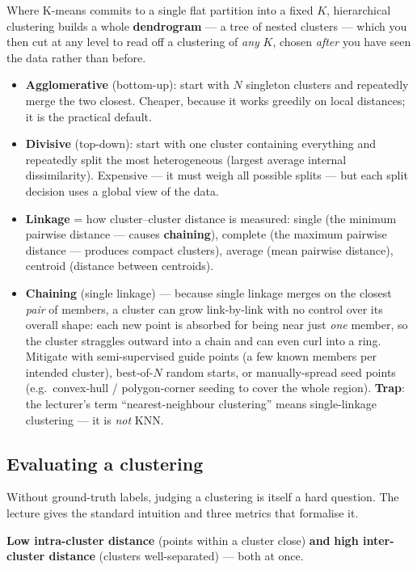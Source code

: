 \documentclass[11pt, a4paper]{article}
\newcommand{\kw}[1]{\textbf{#1}}
\begin{document}
Where K-means commits to a single flat partition into a fixed $K$, hierarchical clustering builds a
whole \kw{dendrogram} — a tree of nested clusters — which you then cut at any level to read off a
clustering of \emph{any} $K$, chosen \emph{after} you have seen the data rather than before.
\begin{itemize}
  \item \kw{Agglomerative} (bottom-up): start with $N$ singleton clusters and repeatedly merge the
  two closest. Cheaper, because it works greedily on local distances; it is the practical default.
  \item \kw{Divisive} (top-down): start with one cluster containing everything and repeatedly split
  the most heterogeneous (largest average internal dissimilarity). Expensive — it must weigh all
  possible splits — but each split decision uses a global view of the data.
  \item \kw{Linkage} = how cluster–cluster distance is measured: single (the minimum pairwise
  distance — causes \kw{chaining}), complete (the maximum pairwise distance — produces compact
  clusters), average (mean pairwise distance), centroid (distance between centroids).
  \item \kw{Chaining} (single linkage) — because single linkage merges on the closest \emph{pair}
  of members, a cluster can grow link-by-link with no control over its overall shape: each new
  point is absorbed for being near just \emph{one} member, so the cluster straggles outward into a
  chain and can even curl into a ring. Mitigate with semi-supervised guide points (a few known
  members per intended cluster), best-of-$N$ random starts, or manually-spread seed points (e.g.\
  convex-hull / polygon-corner seeding to cover the whole region). \kw{Trap}: the lecturer's term
  ``nearest-neighbour clustering'' means single-linkage clustering — it is \emph{not} KNN.
\end{itemize}

\subsection{Evaluating a clustering}

Without ground-truth labels, judging a clustering is itself a hard question. The lecture gives the
standard intuition and three metrics that formalise it.

\begin{defbox}
\kw{Low intra-cluster distance} (points within a cluster close) \kw{and} \kw{high inter-cluster
distance} (clusters well-separated) — both at once.
\end{defbox}
\end{document}
